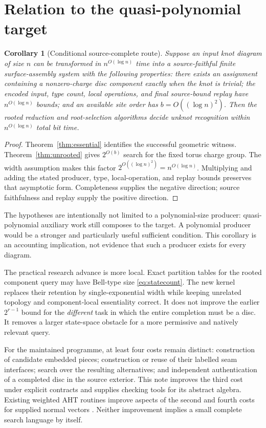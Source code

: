 \documentclass[11pt,letterpaper]{article}
\newtheorem{corollary}[theorem]{Corollary}
\theoremstyle{definition}
\begin{document}
\section{Relation to the quasi-polynomial target}\label{sec:global}
\begin{corollary}[Conditional source-complete route]\label{cor:qp}
Suppose an input knot diagram of size $n$ can be transformed in $n^{O(\log n)}$ time into a source-faithful finite surface-assembly system with the following properties: there exists an assignment containing a nonzero-charge disc component exactly when the knot is trivial; the encoded input, type count, local operations, and final source-bound replay have $n^{O(\log n)}$ bounds; and an available site order has $b=O((\log n)^2)$. Then the rooted reduction and root-selection algorithms decide unknot recognition within $n^{O(\log n)}$ total bit time.
\end{corollary}
\begin{proof}
Theorem~\ref{thm:essential} identifies the successful geometric witness. Theorem~\ref{thm:unrooted} gives $2^{O(b)}$ search for the fixed torus charge group. The width assumption makes this factor $2^{O((\log n)^2)}=n^{O(\log n)}$. Multiplying and adding the stated producer, type, local-operation, and replay bounds preserves that asymptotic form. Completeness supplies the negative direction; source faithfulness and replay supply the positive direction.
\end{proof}

The hypotheses are intentionally not limited to a polynomial-size producer: quasi-polynomial auxiliary work still composes to the target. A polynomial producer would be a stronger and particularly useful sufficient condition. This corollary is an accounting implication, not evidence that such a producer exists for every diagram.

The practical research advance is more local. Exact partition tables for the rooted component query may have Bell-type size \eqref{eq:statecount}. The new kernel replaces their retention by single-exponential width while keeping unrelated topology and component-local essentiality correct. It does not improve the earlier $2^{r-1}$ bound for the \emph{different} task in which the entire completion must be a disc. It removes a larger state-space obstacle for a more permissive and natively relevant query.

For the maintained programme, at least four costs remain distinct: construction of candidate embedded pieces; construction or reuse of their labelled seam interfaces; search over the resulting alternatives; and independent authentication of a completed disc in the source exterior. This note improves the third cost under explicit contracts and supplies checking tools for its abstract algebra. Existing weighted AHT routines improve aspects of the second and fourth costs for supplied normal vectors \cite{weighted,aht}. Neither improvement implies a small complete search language by itself.
\end{document}
